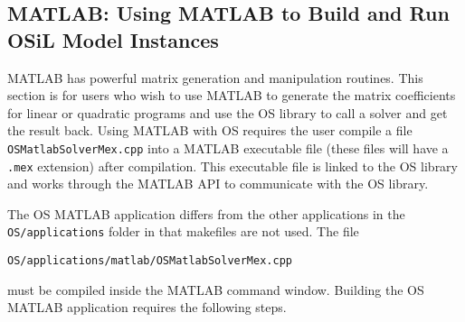 


\subsection{MATLAB:  Using MATLAB to Build and Run OSiL Model Instances}\label{section:usingmatlab}

MATLAB has powerful matrix generation and manipulation routines. This section is for users who wish to use MATLAB to generate the matrix coefficients for linear or quadratic programs and use the OS library to call a solver and get the result back. Using MATLAB with OS requires the user compile a file {\tt OSMatlabSolverMex.cpp} into a MATLAB executable file (these files will have a {\tt .mex} extension) after compilation. This executable file is linked to the OS library and works through the MATLAB API to communicate with the OS library. 



The OS MATLAB application differs from the other applications in the {\tt OS/applications} folder in that makefiles are not used.  The file 
\begin{verbatim}
OS/applications/matlab/OSMatlabSolverMex.cpp
\end{verbatim}
must be compiled inside the MATLAB command window.  Building the OS MATLAB application requires the following steps. 


